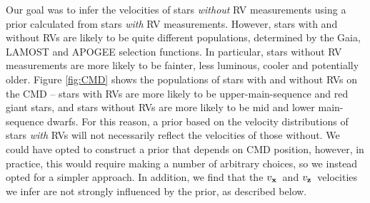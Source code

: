 \documentclass[]{aastex631}
\newcommand{\vx}{$v_{\bf x}$}
\newcommand{\vz}{$v_{\bf z}$}
\begin{document}
Our goal was to infer the velocities of stars {\it without} RV measurements
using a prior calculated from stars {\it with} RV measurements.
However, stars with and without RVs are likely to be quite different
populations, determined by the Gaia, LAMOST and APOGEE selection functions.
In particular, stars without RV measurements are more likely to be fainter,
less luminous, cooler and potentially older.
Figure \ref{fig:CMD} shows the populations of stars with and without RVs on
the CMD -- stars with RVs are more likely to be upper-main-sequence and red
giant stars, and stars without RVs are more likely to be mid and lower
main-sequence dwarfs.
For this reason, a prior based on the velocity distributions of stars {\it
with} RVs will not necessarily reflect the velocities of those without.
We could have opted to construct a prior that depends on CMD position,
however, in practice, this would require making a number of arbitrary choices,
so we instead opted for a simpler approach.
In addition, we find that the \vx\ and \vz\ velocities we infer are not
strongly influenced by the prior, as described below.
\end{document}
